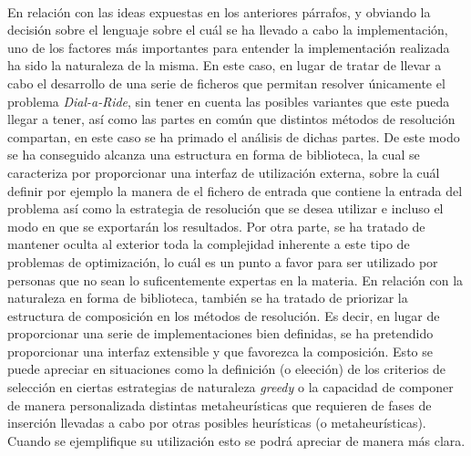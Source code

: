 \documentclass{subfiles}
\begin{document}
        \paragraph{}
        En relación con las ideas expuestas en los anteriores párrafos, y obviando la decisión sobre el lenguaje sobre el cuál se ha llevado a cabo la implementación, uno de los factores más importantes para entender la implementación realizada ha sido la naturaleza de la misma. En este caso, en lugar de tratar de llevar a cabo el desarrollo de una serie de ficheros que permitan resolver únicamente el problema \emph{Dial-a-Ride}, sin tener en cuenta las posibles variantes que este pueda llegar a tener, así como las partes en común que distintos métodos de resolución compartan, en este caso se ha primado el análisis de dichas partes. De este modo se ha conseguido alcanza una estructura en forma de biblioteca, la cual se caracteriza por proporcionar una interfaz de utilización externa, sobre la cuál definir por ejemplo la manera de  el fichero de entrada que contiene la entrada del problema así como la estrategia de resolución que se desea utilizar e incluso el modo en que se exportarán los resultados. Por otra parte, se ha tratado de mantener oculta al exterior toda la complejidad inherente a este tipo de problemas de optimización, lo cuál es un punto a favor para ser utilizado por personas que no sean lo suficentemente expertas en la materia. En relación con la naturaleza en forma de biblioteca, también se ha tratado de priorizar la estructura de composición en los métodos de resolución. Es decir, en lugar de proporcionar una serie de implementaciones bien definidas, se ha pretendido proporcionar una interfaz extensible y que favorezca la composición. Esto se puede apreciar en situaciones como la definición (o eleeción) de los criterios de selección en ciertas estrategias de naturaleza \emph{greedy} o la capacidad de componer de manera personalizada distintas metaheurísticas que requieren de fases de inserción llevadas a cabo por otras posibles heurísticas (o metaheurísticas). Cuando se ejemplifique su utilización esto se podrá apreciar de manera más clara.
\end{document}
